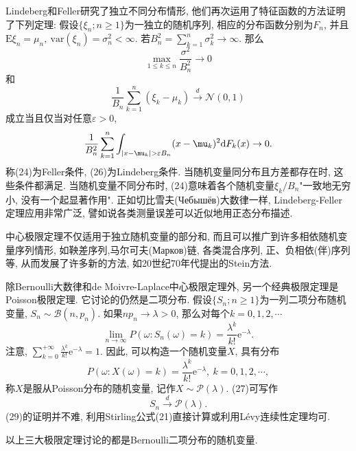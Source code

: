 Lindeberg和Feller研究了独立不同分布情形, 他们再次运用了特征函数的方法证明了下列定理: 假设$\{\xi_n;n\geqslant 1\}$为一独立的随机序列, 相应的分布函数分别为$F_n$, 并且$\mathrm{E}\xi_n = \mu_n,~\mathrm{var}(\xi_n) = \sigma^2_n<\infty$. 若$B_n^2 = \sum_{k=1}^{n}\sigma_k^2\to\infty$. 那么
\begin{equation}
\max_{1\leqslant k\leqslant n} \frac{\sigma^2}{B_n^2}\to 0
\end{equation}
和\begin{equation}
\frac{1}{B_n}\sum_{k=1}^n(\xi_k-\mu_k)\stackrel{d}{\rightarrow}\mathcal{N}(0,1)
\end{equation}
成立当且仅当对任意$\varepsilon>0$,
\begin{equation}
\frac{1}{B_n^2}\sum_{k=1}^n\int_{\abs{x-\mu_k}>\varepsilon B_n}(x-\mu_k)^2\mathrm{d}F_k(x)\to 0.
\end{equation}
称(24)为Feller条件, (26)为Lindeberg条件.  当随机变量同分布且方差都存在时, 这些条件都满足. 当随机变量不同分布时, (24)意味着各个随机变量$\xi_k/B_n$"一致地无穷小, 没有一个起显著作用". 正如切比雪夫(Чебышёв)大数律一样, Lindeberg-Feller定理应用非常广泛, 譬如说各类测量误差可以近似地用正态分布描述.

中心极限定理不仅适用于独立随机变量的部分和, 而且可以推广到许多相依随机变量序列情形, 如鞅差序列,马尔可夫(Марков)链, 各类混合序列, 正、负相依(伴)序列等, 从而发展了许多新的方法, 如20世纪70年代提出的Stein方法.

除Bernoulli大数律和de Moivre-Laplace中心极限定理外, 另一个经典极限定理是Poisson极限定理. 它讨论的仍然是二项分布. 假设$\{S_n;n\geqslant 1\}$为一列二项分布随机变量, $S_n\sim\mathcal{B}(n,p_n)$. 如果$np_n\to \lambda>0$, 那么对每个$k=0,1,2,\cdots$
\begin{equation}
\lim_{n\to\infty}P(\omega:S_n(\omega) = k) = \frac{\lambda^k}{k!}\mathrm{e}^{-\lambda}.
\end{equation}
注意, $\sum_{k=0}^{+\infty}\frac{\lambda^k}{k!}\mathrm{e}^{-\lambda} = 1$. 因此, 可以构造一个随机变量$X$, 具有分布\begin{equation}
P(\omega:X(\omega) = k) = \frac{\lambda^k}{k!}\mathrm{e}^{-\lambda},~k=0,1,2,\cdots,
\end{equation}
称$X$是服从Poisson分布的随机变量, 记作$X\sim\mathcal{P}(\lambda)$. (27)可写作
\begin{equation}
S_n\stackrel{d}{\rightarrow}\mathcal{P}(\lambda).
\end{equation}
(29)的证明并不难, 利用Stirling公式(21)直接计算或利用Lévy连续性定理均可.

以上三大极限定理讨论的都是Bernoulli二项分布的随机变量.


